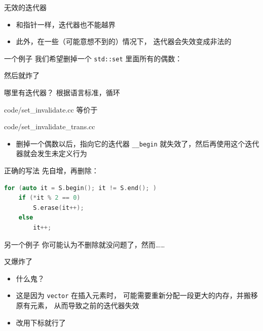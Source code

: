 \documentclass[10pt,mathserif]{beamer}%
\begin{document}
\begin{frame}{无效的迭代器}
	\begin{itemize}
		\item 和指针一样，迭代器也不能越界
		\item 此外，在一些（可能意想不到的）情况下，
			迭代器会失效变成非法的
	\end{itemize}
\end{frame}

\begin{frame}{一个例子}
	我们希望删掉一个 \lstinline!std::set! 里面所有的偶数：
	
\end{frame}

\begin{frame}{然后就炸了}
	
\end{frame}

\begin{frame}{哪里有迭代器？}
	根据语言标准，循环
	
	{code/set_invalidate.cc}
	等价于
	
	{code/set_invalidate_trans.cc}
	\begin{itemize}
		\item<2> 删掉一个偶数以后，指向它的迭代器 \lstinline!__begin!
			就失效了，然后再使用这个迭代器就会发生未定义行为
	\end{itemize}
\end{frame}

\begin{frame}[fragile]{正确的写法}
	先自增，再删除：
\begin{lstlisting}[language=C++, numbers=none]
for (auto it = S.begin(); it != S.end(); )
    if (*it % 2 == 0)
        S.erase(it++);
    else
        it++;
\end{lstlisting}
\end{frame}

\begin{frame}{另一个例子}
	你可能认为不删除就没问题了，然而……
	
\end{frame}

\begin{frame}{又爆炸了}
	
	\begin{itemize}
		\item 什么鬼？
		\item<2-3> 这是因为 \lstinline|vector| 在插入元素时，
			可能需要重新分配一段更大的内存，并搬移原有元素，
			从而导致之前的迭代器失效
		\item<3> 改用下标就行了
	\end{itemize}
\end{frame}
\end{document}
